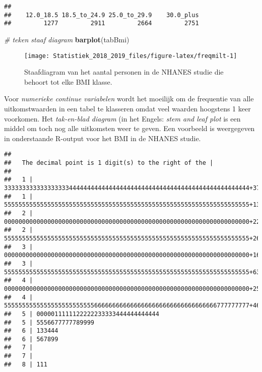 \documentclass[12pt,dutch,coursenotes]{book}
\newenvironment{Shaded}{\begin{snugshade}}{\end{snugshade}}
\newcommand{\KeywordTok}[1]{\textcolor[rgb]{0.13,0.29,0.53}{\textbf{#1}}}
\newcommand{\StringTok}[1]{\textcolor[rgb]{0.31,0.60,0.02}{#1}}
\newcommand{\CommentTok}[1]{\textcolor[rgb]{0.56,0.35,0.01}{\textit{#1}}}
\newcommand{\OperatorTok}[1]{\textcolor[rgb]{0.81,0.36,0.00}{\textbf{#1}}}
\newcommand{\NormalTok}[1]{#1}
\theoremstyle{definition}
\theoremstyle{definition}
\theoremstyle{definition}
\theoremstyle{remark}
\begin{document}
\begin{Shaded}
\end{Shaded}

\begin{verbatim}
## 
##    12.0_18.5 18.5_to_24.9 25.0_to_29.9    30.0_plus 
##         1277         2911         2664         2751
\end{verbatim}

\begin{Shaded}
\begin{Highlighting}[]
\CommentTok{# teken staaf diagram}
\KeywordTok{barplot}\NormalTok{(tabBmi)}
\end{Highlighting}
\end{Shaded}

\begin{figure}

{\centering \texttt{[image: Statistiek\_2018\_2019\_files/figure-latex/freqmilt-1]} 

}

\caption{Staafdiagram van het aantal personen in de NHANES studie die behoort tot elke BMI klasse.}\label{fig:freqmilt}
\end{figure}

Voor \emph{numerieke continue variabelen} wordt het moeilijk om de
frequentie van alle uitkomstwaarden in een tabel te klasseren omdat veel
waarden hoogstens 1 keer voorkomen. Het \emph{tak-en-blad diagram} (in
het Engels: \emph{stem and leaf plot} is een middel om toch nog alle
uitkomsten weer te geven. Een voorbeeld is weergegeven in onderstaande
R-output voor het BMI in de NHANES studie.

\begin{Shaded}
\end{Shaded}

\begin{verbatim}
## 
##   The decimal point is 1 digit(s) to the right of the |
## 
##   1 | 33333333333333333344444444444444444444444444444444444444444444444444+37
##   1 | 55555555555555555555555555555555555555555555555555555555555555555555+1389
##   2 | 00000000000000000000000000000000000000000000000000000000000000000000+2264
##   2 | 55555555555555555555555555555555555555555555555555555555555555555555+2610
##   3 | 00000000000000000000000000000000000000000000000000000000000000000000+1693
##   3 | 55555555555555555555555555555555555555555555555555555555555555555555+635
##   4 | 00000000000000000000000000000000000000000000000000000000000000000000+255
##   4 | 55555555555555555555555556666666666666666666666666666666666777777777+46
##   5 | 0000011111122222233333444444444444
##   5 | 5556677777789999
##   6 | 133444
##   6 | 567899
##   7 | 
##   7 | 
##   8 | 111
\end{verbatim}
\end{document}
